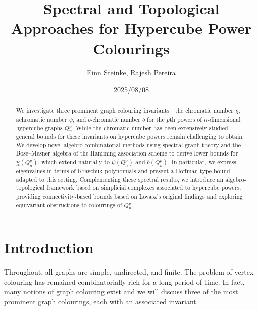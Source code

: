 \documentclass[12pt]{amsart}
\title[Approaches for Hypercube Power Colourings]{Spectral and Topological Approaches for Hypercube Power Colourings}
\author{Finn Steinke, Rajesh Pereira}
\date{2025/08/08}
\numberwithin{figure}{section}
\theoremstyle{plain}
\begin{document}
\begin{abstract}
We investigate three prominent graph colouring invariants—the chromatic number $\chi$, achromatic number $\psi$, and $b$-chromatic number $b$ for the $p$th powers of $n$-dimensional hypercube graphs $Q_{n}^{p}$. While the chromatic number has been extensively studied, general bounds for these invariants on hypercube powers remain challenging to obtain. We develop novel algebro-combinatorial methods using spectral graph theory and the Bose–Mesner algebra of the Hamming association scheme to derive lower bounds for $\chi(Q_{n}^{p})$, which extend naturally to $\psi(Q_{n}^{p})$ and $b(Q_{n}^{p})$. In particular, we express eigenvalues in terms of Kravchuk polynomials and present a Hoffman-type bound adapted to this setting. Complementing these spectral results, we introduce an algebro-topological framework based on simplicial complexes associated to hypercube powers, providing connectivity-based bounds based on Lovasz's original findings and exploring equivariant obstructions to colourings of $Q_{n}^{p}$.
\end{abstract}

\maketitle

\tableofcontents

\section{Introduction}
\indent Throughout, all graphs are simple, undirected, and finite. The problem of vertex colouring has remained combinatorially rich for a long period of time. In fact, many notions of graph colouring exist and we will discuss three of the most prominent graph colourings, each with an associated invariant.
\end{document}
